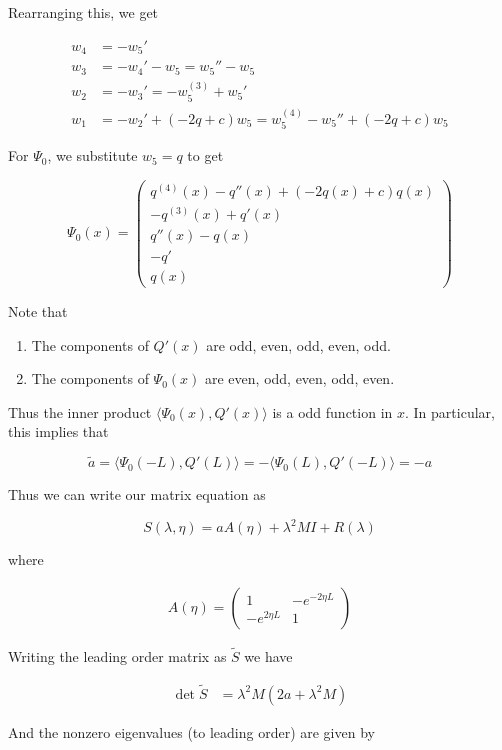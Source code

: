 \documentclass[12pt]{article}
\begin{document}
Rearranging this, we get

\begin{align*}
w_4 &= -w_5' \\
w_3 &= -w_4' - w_5 = w_5'' - w_5 \\
w_2 &= -w_3' = -w_5^{(3)} + w_5' \\
w_1 &= -w_2' + (-2q + c)w_5 = w_5^{(4)} - w_5'' + (-2q + c)w_5
\end{align*}

For $\Psi_0$, we substitute $w_5 = q$ to get

\[
\Psi_0(x) = \begin{pmatrix}
q^{(4)}(x) - q''(x) + (-2q(x) + c)q(x)\\
-q^{(3)}(x) + q'(x) \\
q''(x) - q(x) \\
-q' \\
q(x)
\end{pmatrix}
\]

Note that 

\begin{enumerate}
	\item The components of $Q'(x)$ are odd, even, odd, even, odd.
	\item The components of $\Psi_0(x)$ are even, odd, even, odd, even.
\end{enumerate}

Thus the inner product $\langle \Psi_0(x), Q'(x) \rangle$ is a odd function in $x$. In particular, this implies that 

\[
\tilde{a} = \langle \Psi_0(-L), Q'(L) \rangle = -\langle \Psi_0(L), Q'(-L) \rangle = -a
\]

Thus we can write our matrix equation as

\[
S(\lambda, \eta) = a A(\eta) + \lambda^2 MI + R(\lambda) 
\]

where 

\begin{align*}
A(\eta) = \begin{pmatrix}
1 & -e^{-2 \eta L} \\ -e^{2 \eta L} & 1 
\end{pmatrix}
\end{align*}

Writing the leading order matrix as $\tilde{S}$ we have

\begin{align*}
\det \tilde{S} &= \lambda^2 M ( 2 a + \lambda^2 M)
\end{align*}

And the nonzero eigenvalues (to leading order) are given by
\end{document}
